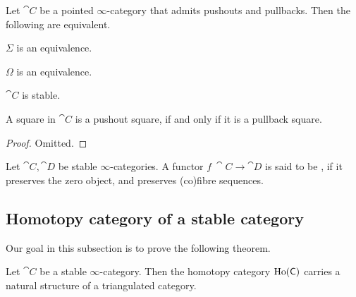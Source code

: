 \begin{proposition}
    Let $\cat C$ be a pointed $\infty$-category 
    that admits pushouts and pullbacks. Then the following are equivalent.
    \begin{itms}
        \item $\Sigma$ is an equivalence.
        \item $\Omega$ is an equivalence.
        \item $\cat C$ is stable.
        \item A square in $\cat C$ is a pushout square,
        if and only if it is a pullback square.
    \end{itms}
\end{proposition}

\begin{proof}
    Omitted.
\end{proof}

\begin{definition}
    Let $\cat C,\cat D$ be stable $\infty$-categories.
    A functor $f\:\cat C\to\cat D$ is said to be ,
    if it preserves the zero object,
    and preserves (co)fibre sequences.
\end{definition}

\subsection{Homotopy category of a stable category}

Our goal in this subsection is to prove the following theorem.

\begin{theorem}
    Let $\cat C$ be a stable $\infty$-category.
    Then the homotopy category $\operatorname{Ho}(\mathsf{C})$
    carries a natural structure of a triangulated category.
\end{theorem}

